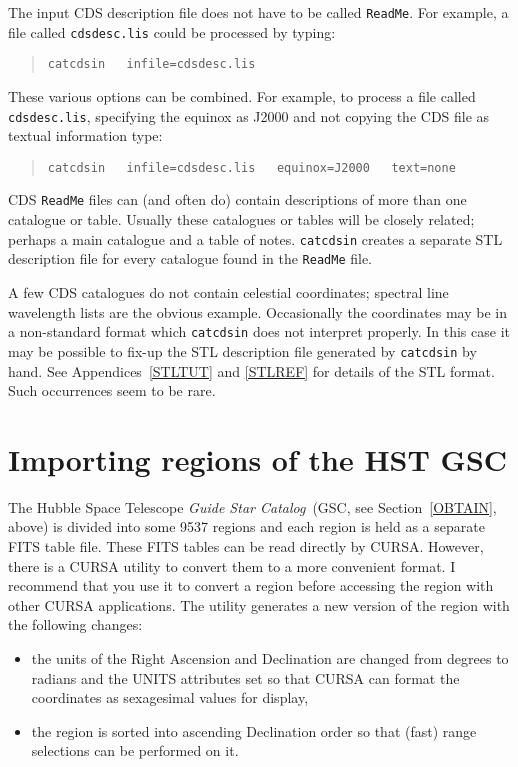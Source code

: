 \documentclass[twoside,11pt]{article}
\newcommand{\xlabel}[1]{}
\renewcommand{\_}{\texttt{\symbol{95}}}
\begin{document}
The input CDS description file does not have to be called {\tt ReadMe}.
For example, a file called {\tt cdsdesc.lis} could be processed by
typing:

\begin{verse}
{\tt catcdsin ~ infile=cdsdesc.lis}
\end{verse}

These various options can be combined.  For example, to process a
file called {\tt cdsdesc.lis}, specifying the equinox as J2000 and
not copying the CDS file as textual information type:

\begin{verse}
{\tt catcdsin ~ infile=cdsdesc.lis ~ equinox=J2000 ~ text=none}
\end{verse}

CDS {\tt ReadMe} files can (and often do) contain descriptions of more
than one catalogue or table.  Usually these catalogues or tables will
be closely related; perhaps a main catalogue and a table of notes.
{\tt catcdsin} creates a separate STL description file for every
catalogue found in the {\tt ReadMe} file.

A few CDS catalogues do not contain celestial coordinates; spectral
line wavelength lists are the obvious example.  Occasionally the
coordinates may be in a non-standard format which {\tt catcdsin} does
not interpret properly.  In this case it may be possible to fix-up the
STL description file generated by {\tt catcdsin} by hand.  See
Appendices~\ref{STLTUT} and \ref{STLREF} for details of the STL format.
Such occurrences seem to be rare.


\section{\xlabel{GSCIN}\label{GSCIN}Importing regions of the HST GSC}

The Hubble Space Telescope {\it Guide Star Catalog}\, (GSC, see
Section~\ref{OBTAIN}, above) is divided into some 9537 regions and
each region is held as a separate FITS table file. These FITS tables can
be read directly by CURSA. However, there is a CURSA utility to convert 
them to a more convenient format. I recommend that you use it to 
convert a region before accessing the region with other CURSA applications.
The utility generates a new version of the region with the following
changes:

\begin{itemize}

  \item the units of the Right Ascension and Declination are changed
   from degrees to radians and the UNITS attributes set so that CURSA
   can format the coordinates as sexagesimal values for display,

  \item the region is sorted into ascending Declination order so that
   (fast) range selections can be performed on it.

\end{itemize}
\end{document}
